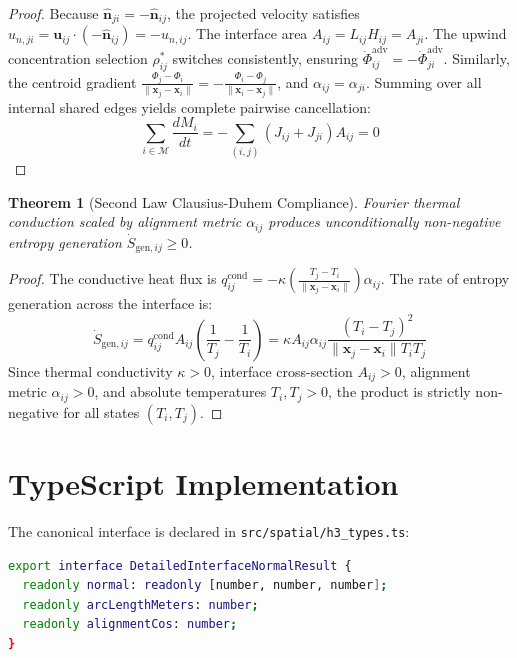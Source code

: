 \documentclass[11pt,a4paper]{article}
\newtheorem{theorem}{Theorem}
\begin{document}
\begin{proof}
Because $\hat{\mathbf{n}}_{ji} = -\hat{\mathbf{n}}_{ij}$, the projected velocity satisfies $u_{n, ji} = \mathbf{u}_{ij} \cdot (-\hat{\mathbf{n}}_{ij}) = -u_{n, ij}$. The interface area $A_{ij} = L_{ij} H_{ij} = A_{ji}$. The upwind concentration selection $\rho_{ij}^*$ switches consistently, ensuring $\dot{\Phi}_{ij}^{\text{adv}} = -\dot{\Phi}_{ji}^{\text{adv}}$. Similarly, the centroid gradient $\frac{\Phi_j - \Phi_i}{\|\mathbf{x}_j - \mathbf{x}_i\|} = -\frac{\Phi_i - \Phi_j}{\|\mathbf{x}_i - \mathbf{x}_j\|}$, and $\alpha_{ij} = \alpha_{ji}$. Summing over all internal shared edges yields complete pairwise cancellation:
\begin{equation}
  \sum_{i \in \mathcal{M}} \frac{d M_i}{dt} = -\sum_{(i,j)} (J_{ij} + J_{ji}) A_{ij} = 0
\end{equation}
\end{proof}

\begin{theorem}[Second Law Clausius-Duhem Compliance]
Fourier thermal conduction scaled by alignment metric $\alpha_{ij}$ produces unconditionally non-negative entropy generation $\dot{S}_{\text{gen}, ij} \ge 0$.
\end{theorem}

\begin{proof}
The conductive heat flux is $q_{ij}^{\text{cond}} = -\kappa \left(\frac{T_j - T_i}{\|\mathbf{x}_j - \mathbf{x}_i\|}\right) \alpha_{ij}$. The rate of entropy generation across the interface is:
\begin{equation}
  \dot{S}_{\text{gen}, ij} = q_{ij}^{\text{cond}} A_{ij} \left(\frac{1}{T_j} - \frac{1}{T_i}\right) = \kappa A_{ij} \alpha_{ij} \frac{(T_i - T_j)^2}{\|\mathbf{x}_j - \mathbf{x}_i\| T_i T_j}
\end{equation}
Since thermal conductivity $\kappa > 0$, interface cross-section $A_{ij} > 0$, alignment metric $\alpha_{ij} > 0$, and absolute temperatures $T_i, T_j > 0$, the product is strictly non-negative for all states $(T_i, T_j)$.
\end{proof}

\section{TypeScript Implementation}

The canonical interface is declared in \texttt{src/spatial/h3\_types.ts}:
\begin{lstlisting}[language=bash]
export interface DetailedInterfaceNormalResult {
  readonly normal: readonly [number, number, number];
  readonly arcLengthMeters: number;
  readonly alignmentCos: number;
}
\end{lstlisting}
\end{document}
